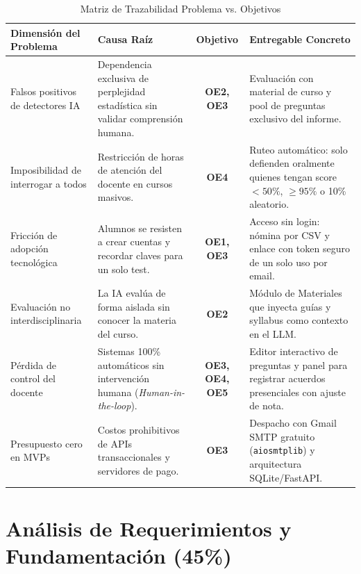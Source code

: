 \documentclass[11pt,a4paper]{article}
\begin{document}
\begin{table}[h!]
\centering
\small
\begin{tabularx}{\textwidth}{p{4.2cm} p{4.2cm} c X}
\toprule
\textbf{Dimensión del Problema} & \textbf{Causa Raíz} & \textbf{Objetivo} & \textbf{Entregable Concreto} \\
\midrule
Falsos positivos de detectores IA & Dependencia exclusiva de perplejidad estadística sin validar comprensión humana. & \textbf{OE2, OE3} & Evaluación con material de curso y pool de preguntas exclusivo del informe. \\
\addlinespace
Imposibilidad de interrogar a todos & Restricción de horas de atención del docente en cursos masivos. & \textbf{OE4} & Ruteo automático: solo defienden oralmente quienes tengan score $< 50\%$, $\ge 95\%$ o 10\% aleatorio. \\
\addlinespace
Fricción de adopción tecnológica & Alumnos se resisten a crear cuentas y recordar claves para un solo test. & \textbf{OE1, OE3} & Acceso sin login: nómina por CSV y enlace con token seguro de un solo uso por email. \\
\addlinespace
Evaluación no interdisciplinaria & La IA evalúa de forma aislada sin conocer la materia del curso. & \textbf{OE2} & Módulo de Materiales que inyecta guías y syllabus como contexto en el LLM. \\
\addlinespace
Pérdida de control del docente & Sistemas 100\% automáticos sin intervención humana (\textit{Human-in-the-loop}). & \textbf{OE3, OE4, OE5} & Editor interactivo de preguntas y panel para registrar acuerdos presenciales con ajuste de nota. \\
\addlinespace
Presupuesto cero en MVPs & Costos prohibitivos de APIs transaccionales y servidores de pago. & \textbf{OE3} & Despacho con Gmail SMTP gratuito (\texttt{aiosmtplib}) y arquitectura SQLite/FastAPI. \\
\bottomrule
\end{tabularx}
\caption{Matriz de Trazabilidad Problema vs. Objetivos}
\end{table}

\newpage

\section{Análisis de Requerimientos y Fundamentación (45\%)}
\end{document}
